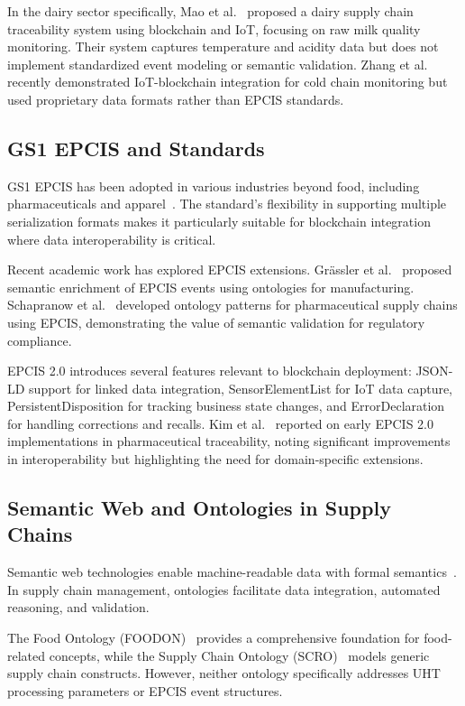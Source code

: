 \documentclass[preprint,review,12pt,authoryear]{elsarticle}
\begin{document}
In the dairy sector specifically, Mao et al.~\cite{mao2020novel} proposed a dairy supply chain traceability system using blockchain and IoT, focusing on raw milk quality monitoring. Their system captures temperature and acidity data but does not implement standardized event modeling or semantic validation. Zhang et al.~\cite{zhang2024iot} recently demonstrated IoT-blockchain integration for cold chain monitoring but used proprietary data formats rather than EPCIS standards.

\subsection{GS1 EPCIS and Standards}

GS1 EPCIS has been adopted in various industries beyond food, including pharmaceuticals and apparel~\cite{gs1epcis2021}. The standard's flexibility in supporting multiple serialization formats makes it particularly suitable for blockchain integration where data interoperability is critical.

Recent academic work has explored EPCIS extensions. Gr\"assler et al.~\cite{grassler2021semantic} proposed semantic enrichment of EPCIS events using ontologies for manufacturing. Schapranow et al.~\cite{schapranow2020ontology} developed ontology patterns for pharmaceutical supply chains using EPCIS, demonstrating the value of semantic validation for regulatory compliance.

EPCIS 2.0 introduces several features relevant to blockchain deployment: JSON-LD support for linked data integration, SensorElementList for IoT data capture, PersistentDisposition for tracking business state changes, and ErrorDeclaration for handling corrections and recalls. Kim et al.~\cite{kim2023epcis} reported on early EPCIS 2.0 implementations in pharmaceutical traceability, noting significant improvements in interoperability but highlighting the need for domain-specific extensions.

\subsection{Semantic Web and Ontologies in Supply Chains}

Semantic web technologies enable machine-readable data with formal semantics~\cite{berners2001semantic}. In supply chain management, ontologies facilitate data integration, automated reasoning, and validation.

The Food Ontology (FOODON)~\cite{griffiths2018foodon} provides a comprehensive foundation for food-related concepts, while the Supply Chain Ontology (SCRO)~\cite{iof2023supply} models generic supply chain constructs. However, neither ontology specifically addresses UHT processing parameters or EPCIS event structures.
\end{document}
